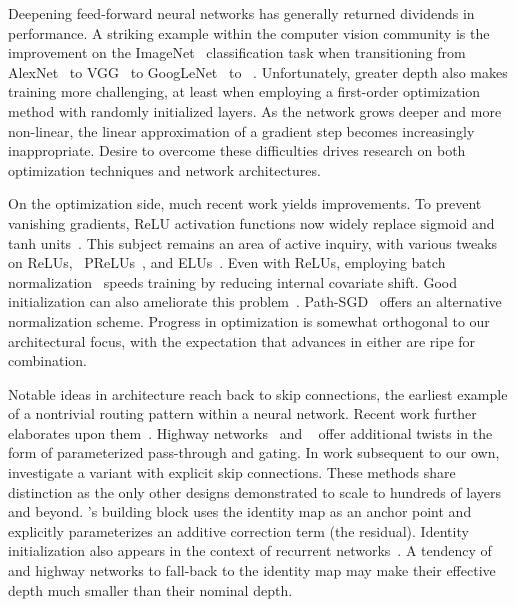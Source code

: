 Deepening feed-forward neural networks has generally returned dividends in
performance.  A striking example within the computer vision community is the
improvement on the ImageNet~\citep{deng2009imagenet} classification task when
transitioning from AlexNet~\citep{alexNet12} to VGG~\citep{vgg16} to
GoogLeNet~\citep{szegedy2015inception} to {\resnet}~\citep{he2015deep}.
Unfortunately, greater depth also makes training more challenging, at least
when employing a first-order optimization method with randomly initialized
layers.  As the network grows deeper and more non-linear, the linear
approximation of a gradient step becomes increasingly inappropriate.  Desire
to overcome these difficulties drives research on both optimization techniques
and network architectures.

On the optimization side, much recent work yields improvements.  To prevent
vanishing gradients, ReLU activation functions now widely replace sigmoid and
tanh units~\citep{nair2010rectified}.  This subject remains an area of active
inquiry, with various tweaks on ReLUs, \eg~PReLUs~\citep{he2015prelu}, and
ELUs~\citep{elu}.  Even with ReLUs, employing batch normalization~\citep{
batchnorm} speeds training by reducing internal covariate shift.  Good
initialization can also ameliorate this problem~\citep{glorot2010understanding,
mishkin2015all}.  Path-SGD~\citep{pathsgd} offers an alternative normalization
scheme.  Progress in optimization is somewhat orthogonal to our architectural
focus, with the expectation that advances in either are ripe for combination.

Notable ideas in architecture reach back to skip connections, the earliest
example of a nontrivial routing pattern within a neural network.  Recent work
further elaborates upon them~\citep{MYP:ACCV:2014,HAGM:CVPR:2015}.  Highway
networks~\citep{srivastava2015highway} and {\resnet}~\citep{he2015deep,
he2016identity} offer additional twists in the form of parameterized
pass-through and gating.  In work subsequent to our own, \cite{densenet}
investigate a {\resnet} variant with explicit skip connections.  These methods
share distinction as the only other designs demonstrated to scale to hundreds
of layers and beyond.  {\Resnet}'s building block uses the identity map as an
anchor point and explicitly parameterizes an additive correction term (the
residual).  Identity initialization also appears in the context of recurrent
networks~\citep{le2015simple}.  A tendency of {\resnet} and highway networks to
fall-back to the identity map may make their effective depth much smaller than
their nominal depth.

